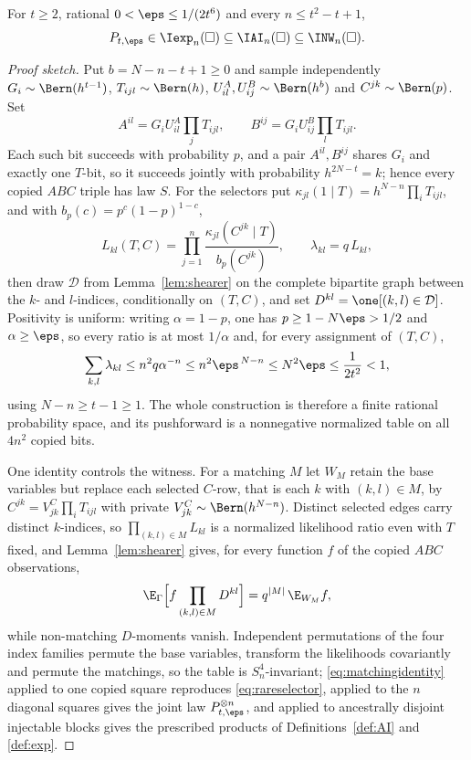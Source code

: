\begin{proposition}\label{prop:rareselector}
For $t\ge2$, rational $0<\eps\le1/(2t^6)$ and every $n\le t^2-t+1$,
\[
P_{t,\eps}\in\Iexp_n(\square)\subseteq\IAI_n(\square)\subseteq\INW_n(\square).
\]
\end{proposition}

\begin{proof}[Proof sketch]
Put $b=N-n-t+1\ge0$ and sample independently $G_i\sim\Bern(h^{t-1})$, $T_{ijl}\sim\Bern(h)$, $U^A_{il},U^B_{ij}\sim\Bern(h^b)$ and $C^{jk}\sim\Bern(p)$. Set
\[
A^{il}=G_iU^A_{il}\prod_jT_{ijl},\qquad
B^{ij}=G_iU^B_{ij}\prod_lT_{ijl}.
\]
Each such bit succeeds with probability $p$, and a pair $A^{il},B^{ij}$ shares $G_i$ and exactly one $T$-bit, so it succeeds jointly with probability $h^{2N-t}=k$; hence every copied $ABC$ triple has law $S$. For the selectors put $\kappa_{jl}(1\mid T)=h^{N-n}\prod_iT_{ijl}$, and with $b_p(c)=p^c(1-p)^{1-c}$,
\[
L_{kl}(T,C)=\prod_{j=1}^n\frac{\kappa_{jl}(C^{jk}\mid T)}{b_p(C^{jk})},\qquad
\lambda_{kl}=q\,L_{kl},
\]
then draw $\mathcal D$ from Lemma~\ref{lem:shearer} on the complete bipartite graph between the $k$- and $l$-indices, conditionally on $(T,C)$, and set $D^{kl}=\one[(k,l)\in\mathcal D]$. Positivity is uniform: writing $\alpha=1-p$, one has $p\ge1-N\eps>1/2$ and $\alpha\ge\eps$, so every ratio is at most $1/\alpha$ and, for every assignment of $(T,C)$,
\[
\sum_{k,l}\lambda_{kl}\le n^2q\alpha^{-n}\le n^2\eps^{\,N-n}\le N^2\eps\le\frac1{2t^2}<1,
\]
using $N-n\ge t-1\ge1$. The whole construction is therefore a finite rational probability space, and its pushforward is a nonnegative normalized table on all $4n^2$ copied bits.

One identity controls the witness. For a matching $M$ let $W_M$ retain the base variables but replace each selected $C$-row, that is each $k$ with $(k,l)\in M$, by $C^{jk}=V^C_{jk}\prod_iT_{ijl}$ with private $V^C_{jk}\sim\Bern(h^{N-n})$. Distinct selected edges carry distinct $k$-indices, so $\prod_{(k,l)\in M}L_{kl}$ is a normalized likelihood ratio even with $T$ fixed, and Lemma~\ref{lem:shearer} gives, for every function $f$ of the copied $ABC$ observations,
\begin{equation}\label{eq:matchingidentity}
\E_\Gamma\Bigl[f\prod_{(k,l)\in M}D^{kl}\Bigr]=q^{|M|}\,\E_{W_M}f ,
\end{equation}
while non-matching $D$-moments vanish. Independent permutations of the four index families permute the base variables, transform the likelihoods covariantly and permute the matchings, so the table is $S_n^4$-invariant; \eqref{eq:matchingidentity} applied to one copied square reproduces \eqref{eq:rareselector}, applied to the $n$ diagonal squares gives the joint law $P_{t,\eps}^{\otimes n}$, and applied to ancestrally disjoint injectable blocks gives the prescribed products of Definitions~\ref{def:AI} and \ref{def:exp}.
\end{proof}

